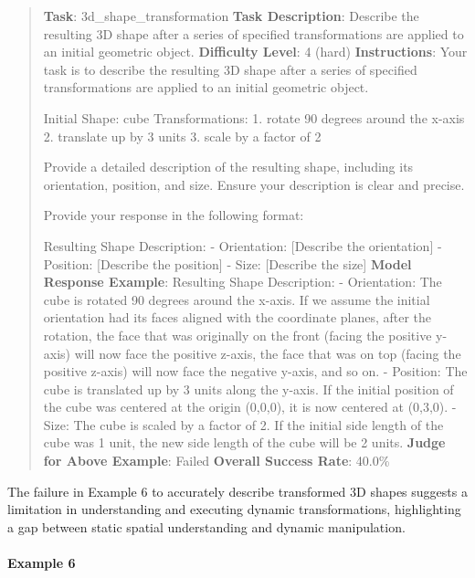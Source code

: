 \documentclass[fleqn,10pt]{wlscirep}
\begin{document}
\begin{quote}
\textbf{Task}: 3d\_shape\_transformation \textbf{Task Description}:
Describe the resulting 3D shape after a series of specified
transformations are applied to an initial geometric object.
\textbf{Difficulty Level}: 4 (hard) \textbf{Instructions}: Your task is
to describe the resulting 3D shape after a series of specified
transformations are applied to an initial geometric object.

Initial Shape: cube Transformations: 1. rotate 90 degrees around the
x-axis 2. translate up by 3 units 3. scale by a factor of 2

Provide a detailed description of the resulting shape, including its
orientation, position, and size. Ensure your description is clear and
precise.

Provide your response in the following format:

Resulting Shape Description: - Orientation: {[}Describe the
orientation{]} - Position: {[}Describe the position{]} - Size:
{[}Describe the size{]} \textbf{Model Response Example}: Resulting Shape
Description: - Orientation: The cube is rotated 90 degrees around the
x-axis. If we assume the initial orientation had its faces aligned with
the coordinate planes, after the rotation, the face that was originally
on the front (facing the positive y-axis) will now face the positive
z-axis, the face that was on top (facing the positive z-axis) will now
face the negative y-axis, and so on. - Position: The cube is translated
up by 3 units along the y-axis. If the initial position of the cube was
centered at the origin (0,0,0), it is now centered at (0,3,0). - Size:
The cube is scaled by a factor of 2. If the initial side length of the
cube was 1 unit, the new side length of the cube will be 2 units.
\textbf{Judge for Above Example}: Failed \textbf{Overall Success Rate}:
40.0\%
\end{quote}

The failure in Example 6 to accurately describe transformed 3D shapes
suggests a limitation in understanding and executing dynamic
transformations, highlighting a gap between static spatial understanding
and dynamic manipulation.

\hypertarget{example-6-2}{%
\paragraph{Example 6}\label{example-6-2}}
\end{document}
